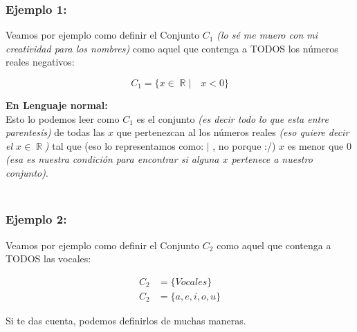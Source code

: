 \documentclass[12pt]{report}                                %
\DeclareMathOperator \Real {\mathbb{R}}                     %
\begin{document}
            \clearpage
            \subsubsection{\large \\Ejemplo 1:}

                Veamos por ejemplo como definir el Conjunto $C_1$ \emph{(lo sé me muero con
                mi creatividad para los nombres)} como aquel que contenga a TODOS los números
                reales negativos:

                \begin{equation*}   
                    C_1 = \{ x \in \Real |\quad x < 0 \}
                \end{equation*}

                \textbf{En Lenguaje normal:\\}
                Esto lo podemos leer como $C_1$ es el conjunto \emph{(es decir todo lo que esta
                entre parentesís)} de todas las $x$ que pertenezcan al los números reales
                \emph{(eso quiere decir el $x \in \Real$)} tal que (eso lo representamos
                como: $|$ , no porque :/) $x$ es menor que 0 \emph{(esa es nuestra condición para
                encontrar si alguna $x$ pertenece a nuestro conjunto)}.

                \subsubsection{\large \\Ejemplo 2:}

                Veamos por ejemplo como definir el Conjunto $C_2$ como aquel que contenga a
                TODOS las vocales:

                \begin{equation*}   
                \begin{split}   
                    C_2 &= \{ Vocales \}            \\
                    C_2 &= \{a, e, i, o, u \}
                \end{split}   
                \end{equation*}

                Si te das cuenta, podemos definirlos de muchas maneras.
\end{document}
